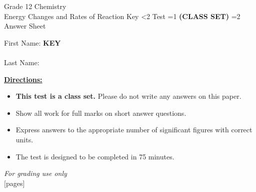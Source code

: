 \documentclass[addpoints]{exam}
\newcommand{\event}{Energy Changes and Rates of Reaction}
\newcommand{\tournament}{}  %
\def\type{0}
\begin{document}
\begin{center}
    {\huge Grade 12 Chemistry \\ \event
    \ifprintanswers
     \space Key
    \else
     \space \ifnum\type<2 Test \fi \ifnum\type=1 \textbf{(CLASS SET)} \fi \ifnum\type=2 Answer Sheet \fi
    \fi \\ \vspace{3mm}\tournament\vspace{1mm}}
\end{center}

\vspace{.25\textheight}

\begin{center}
    First Name: \ifprintanswers
    \underline{\hspace{3.5cm}}\textbf{KEY}\underline{\hspace{5.5cm}}\\\vspace{5mm}
    \else
        \underline{\hspace{10cm}}\\ \vspace{5mm}
    \fi
    Last Name: \underline{\hspace{10cm}}\\ \vspace{5mm}
\end{center}

\noindent\textbf{\underline{Directions:}}
\begin{itemize}
    \ifnum\type=1 \item \textbf{This test is a class set.} Please do not write any answers on this paper. \fi
    \item Show all work for full marks on short answer questions.
    \item Express answers to the appropriate number of significant figures with correct units.
    \item The test is designed to be completed in 75 minutes.
\end{itemize}
\begin{center}
\textit{For grading use only}\\
[pages]
\end{center}
\end{document}
